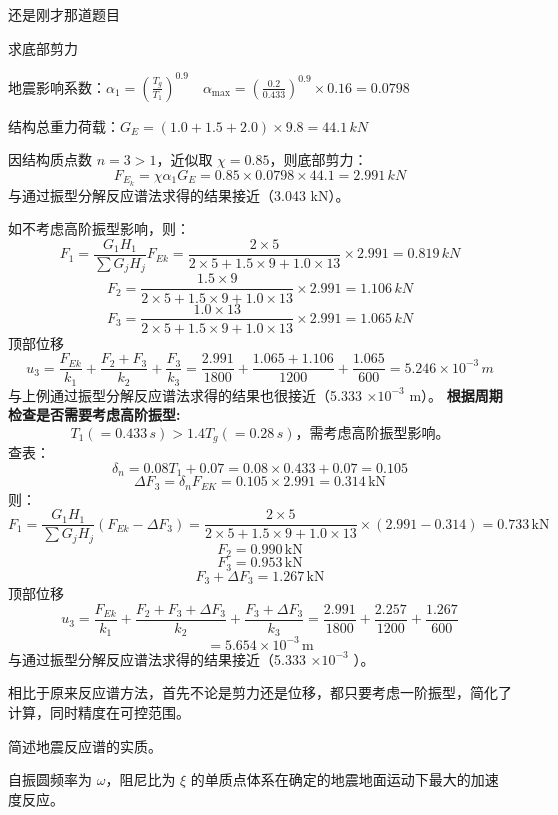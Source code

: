 \documentclass[12pt, a4paper, oneside, UTF8]{ctexbook}
\begin{document}
\begin{example}
    还是刚才那道题目

    求底部剪力

地震影响系数：\( \alpha_1 = \left( \frac{T_g}{T_1} \right)^{0.9} \quad \alpha_{\text{max}} = \left( \frac{0.2}{0.433} \right)^{0.9} \times 0.16 = 0.0798 \)

结构总重力荷载：\( G_E = (1.0 + 1.5 + 2.0) \times 9.8 = 44.1 \, kN \)

因结构质点数 \( n = 3 > 1 \)，近似取 \( \chi = 0.85 \)，则底部剪力：
\[ F_{E_k} = \chi \alpha_1 G_E = 0.85 \times 0.0798 \times 44.1 = 2.991 \, kN \]
与通过振型分解反应谱法求得的结果接近（3.043 kN）。

如不考虑高阶振型影响，则：
\[
F_1 = \frac{G_1 H_1}{\sum G_j H_j} F_{Ek} = \frac{2 \times 5}{2 \times 5 + 1.5 \times 9 + 1.0 \times 13} \times 2.991 = 0.819 \, kN
\]
\[
F_2 = \frac{1.5 \times 9}{2 \times 5 + 1.5 \times 9 + 1.0 \times 13} \times 2.991 = 1.106 \, kN
\]
\[
F_3 = \frac{1.0 \times 13}{2 \times 5 + 1.5 \times 9 + 1.0 \times 13} \times 2.991 = 1.065 \, kN
\]
顶部位移
\[
u_3 = \frac{F_{Ek}}{k_1} + \frac{F_2 + F_3}{k_2} + \frac{F_3}{k_3} = \frac{2.991}{1800} + \frac{1.065 + 1.106}{1200} + \frac{1.065}{600} = 5.246 \times 10^{-3} \, m
\]
与上例通过振型分解反应谱法求得的结果也很接近（5.333 $\times 10^{-3}$ m）。
\textbf{根据周期检查是否需要考虑高阶振型:}
\[ T_1 (= 0.433 \, s) > 1.4 T_g (= 0.28 \, s) \text{，需考虑高阶振型影响。} \]
查表：\[ \delta_n = 0.08 T_1 + 0.07 = 0.08 \times 0.433 + 0.07 = 0.105 \]
\[ \Delta F_3 = \delta_n F_{EK} = 0.105 \times 2.991 = 0.314 \, \text{kN} \]
则：
\[ F_1 = \frac{G_1 H_1}{\sum G_j H_j} (F_{Ek} - \Delta F_3) = \frac{2 \times 5}{2 \times 5 + 1.5 \times 9 + 1.0 \times 13} \times (2.991 - 0.314) = 0.733 \, \text{kN} \]
\[ F_2 = 0.990 \, \text{kN} \]
\[ F_3 = 0.953 \, \text{kN} \]
\[ F_3 + \Delta F_3 = 1.267 \, \text{kN} \]
顶部位移
\[ u_3 = \frac{F_{Ek}}{k_1} + \frac{F_2 + F_3 + \Delta F_3}{k_2} + \frac{F_3 + \Delta F_3}{k_3} = \frac{2.991}{1800} + \frac{2.257}{1200} + \frac{1.267}{600} \]
\[ = 5.654 \times 10^{-3} \, \text{m} \]
与通过振型分解反应谱法求得的结果接近（5.333 $\times 10^{-3}$ ）。

\end{example}

\begin{remark}
    相比于原来反应谱方法，首先不论是剪力还是位移，都只要考虑一阶振型，简化了计算，同时精度在可控范围。
\end{remark}

\begin{example}
    简述地震反应谱的实质。

自振圆频率为 $\omega$，阻尼比为 $\xi$ 的单质点体系在确定的地震地面运动下最大的加速度反应。
\end{example}
\end{document}
